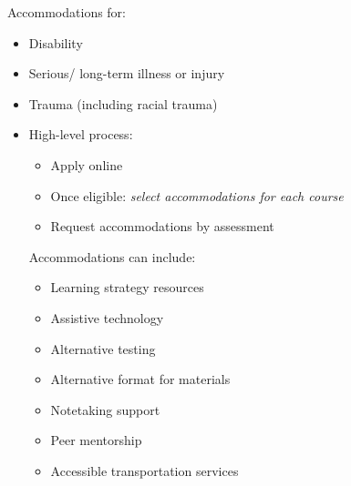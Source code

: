 \begin{frame}[fragile]
    \begin{multicols}{2}
    Accommodations for:
        \begin{itemize}
            \item Disability
            \item Serious/ long-term illness or injury
\item Trauma (including racial trauma)
\item High-level process:
\begin{itemize}
    \item Apply online
    \item Once eligible: \textit{select accommodations for each course}
\item Request accommodations by assessment
\end{itemize}

\columnbreak
Accommodations can include:
\begin{itemize}
    \item Learning strategy resources
\item Assistive technology
\item Alternative testing
\item Alternative format for materials
\item Notetaking support
\item Peer mentorship
\item Accessible transportation services
\end{itemize}

        \end{itemize}
    \end{multicols}
\end{frame}




